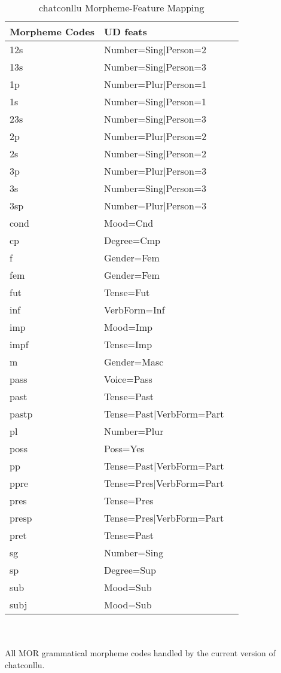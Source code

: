 \newpage
\vspace{-2cm}
\begin{table}[h!]
\caption {chatconllu Morpheme-Feature Mapping} \label{tab:featsmap}
\begin{tabular}{@{}lll@{}}
\toprule
\textbf{Morpheme Codes} & \textbf{UD feats}\\ \midrule
	12s & Number=Sing|Person=2\\
	13s & Number=Sing|Person=3\\
	1p & Number=Plur|Person=1\\
	1s & Number=Sing|Person=1\\
	23s & Number=Sing|Person=3\\
	2p & Number=Plur|Person=2\\
	2s & Number=Sing|Person=2\\
	3p & Number=Plur|Person=3\\
	3s & Number=Sing|Person=3\\
	3sp & Number=Plur|Person=3\\
	cond & Mood=Cnd\\
	cp & Degree=Cmp\\
	f & Gender=Fem\\
	fem & Gender=Fem\\
	fut & Tense=Fut\\
	inf & VerbForm=Inf\\
	imp & Mood=Imp\\
	impf & Tense=Imp\\
	m & Gender=Masc\\
	pass & Voice=Pass\\
	past & Tense=Past\\
	pastp & Tense=Past|VerbForm=Part\\
	pl & Number=Plur\\
	poss & Poss=Yes\\
	pp & Tense=Past|VerbForm=Part\\
	ppre & Tense=Pres|VerbForm=Part\\
	pres & Tense=Pres\\
	presp & Tense=Pres|VerbForm=Part\\
	pret & Tense=Past\\
	sg & Number=Sing\\
	sp & Degree=Sup\\
	sub & Mood=Sub\\
	subj & Mood=Sub\\\bottomrule
\end{tabular}\\
\vspace{0.5cm}
\\
All MOR grammatical morpheme codes handled by the current version of chatconllu.\\
\end{table}
